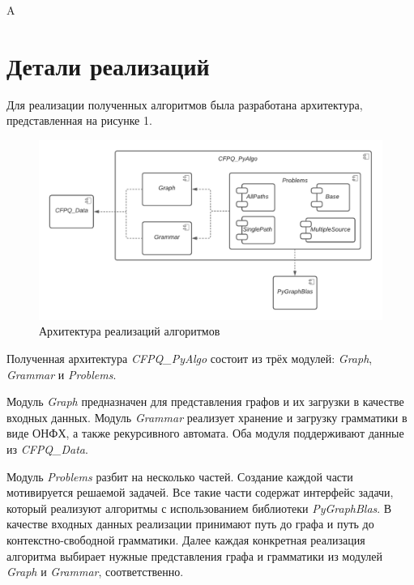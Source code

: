 \begin{algorithm}[H]
\begin{algorithmic}[1]
    \EndFor
    \State \Return A
\EndFunction

\end{algorithmic}
\end{algorithm}

\section{Детали реализаций}
Для реализации полученных алгоритмов была разработана архитектура, представленная на рисунке 1.
\begin{figure}[H]
    \centering
    \includegraphics[scale=0.8]{img/pyalgo.pdf}
    \caption{Архитектура реализаций алгоритмов}
\end{figure}

Полученная архитектура \textit{CFPQ\_PyAlgo} состоит из трёх модулей: \textit{Graph}, \textit{Grammar} и \textit{Problems}. 

Модуль \textit{Graph} предназначен для представления графов и их загрузки в качестве входных данных. Модуль \textit{Grammar} реализует хранение и загрузку грамматики в виде ОНФХ, а также рекурсивного автомата. Оба модуля поддерживают данные из \textit{CFPQ\_Data}.

Модуль \textit{Problems} разбит на несколько частей. Создание каждой части мотивируется решаемой задачей. Все такие части содержат интерфейс задачи, который реализуют алгоритмы с использованием библиотеки \textit{PyGraphBlas}. В качестве входных данных реализации принимают путь до графа и путь до контекстно-свободной грамматики. Далее каждая конкретная реализация алгоритма выбирает нужные представления графа и грамматики из модулей \textit{Graph} и \textit{Grammar}, соответственно.

